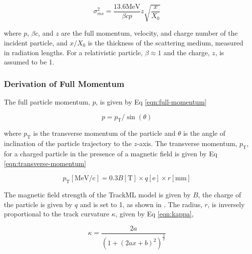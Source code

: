 
\begin{equation}
    \sigma_{ms}^{2} = \frac{13.6 \text{MeV}}{\beta c p} z \sqrt{\frac{x}{X_0}}
    \label{eqn:simplified-moliere-equation}
\end{equation}

where $p$, $\beta c$, and $z$ are the full momentum, velocity, and charge number of the incident particle, and $x/X_0$ is the thickness of the scattering medium, measured in radiation lengths. For a relativistic particle, $\beta \approx 1$ and the charge, $z$, is assumed to be 1. 




\subsubsection{Derivation of Full Momentum}

The full particle momentum, $p$, is given by Eq \eqref{eqn:full-momentum}

\begin{equation}
    p = p_\text{T} / \sin(\theta)
    \label{eqn:full-momentum}
\end{equation}

where $p_\text{T}$ is the transverse momentum of the particle and $\theta$ is the angle of inclination of the particle trajectory to the $z$-axis. The transverse momentum, $p_\text{T}$, for a charged particle in the presence of a magnetic field is given by Eq \eqref{eqn:transverse-momentum}

\begin{equation}
    p_\text{T} [\text{MeV/c}] = 0.3 B [\text{T}] \times q [\text{e}] \times r [\text{mm}]
    \label{eqn:transverse-momentum}
\end{equation}

The magnetic field strength of the TrackML model is given by $B$, the charge of the particle is given by $q$ and is set to 1, as shown in \cite{ATLAS-CONF-2010-072}. The radius, $r$, is inversely proportional to the track curvature $\kappa$, given by Eq \eqref{eqn:kappa}, 

\begin{equation}
\kappa = \frac{2a}{(1 + (2ax + b)^2)^{\frac{3}{2}}}
\label{eqn:kappa}
\end{equation}

